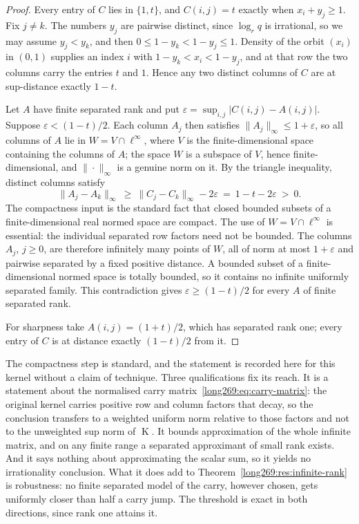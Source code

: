 \documentclass[11pt]{article}
\newcommand{\Kernel}{\operatorname{K}}
\begin{document}
\begin{proof}
Every entry of $C$ lies in $\{1,t\}$, and $C(i,j)=t$ exactly when
$x_i+y_j\ge1$.  Fix $j\ne k$.  The numbers $y_j$ are pairwise distinct, since
$\log_r q$ is irrational, so we may assume $y_j<y_k$, and then
$0\le1-y_k<1-y_j\le1$.  Density of the orbit $(x_i)$ in $(0,1)$ supplies an
index $i$ with $1-y_k<x_i<1-y_j$, and at that row the two columns carry the
entries $t$ and $1$.  Hence any two distinct columns of $C$ are at sup-distance
exactly $1-t$.

Let $A$ have finite separated rank and put
$\varepsilon=\sup_{i,j}|C(i,j)-A(i,j)|$.  Suppose $\varepsilon<(1-t)/2$.  Each
column $A_j$ then satisfies $\|A_j\|_\infty\le1+\varepsilon$, so all columns of
$A$ lie in $W=V\cap\ell^{\infty}$, where $V$ is the finite-dimensional space
containing the columns of $A$; the space $W$ is a subspace of $V$, hence
finite-dimensional, and $\|\cdot\|_\infty$ is a genuine norm on it.  By the
triangle inequality, distinct columns satisfy
\[
 \|A_j-A_k\|_\infty\ \ge\ \|C_j-C_k\|_\infty-2\varepsilon
 \ =\ 1-t-2\varepsilon\ >\ 0 .
\]
The compactness input is the standard fact that closed bounded subsets of
a finite-dimensional real normed space are compact. The use of
$W=V\cap\ell^\infty$ is essential: the individual separated row factors
need not be bounded.
The columns $A_j$, $j\ge0$, are therefore infinitely many points of $W$, all of
norm at most $1+\varepsilon$ and pairwise separated by a fixed positive
distance.  A bounded subset of a finite-dimensional normed space is totally
bounded, so it contains no infinite uniformly separated family.  This
contradiction gives $\varepsilon\ge(1-t)/2$ for every $A$ of finite separated
rank.

For sharpness take $A(i,j)=(1+t)/2$, which has separated rank one; every entry
of $C$ is at distance exactly $(1-t)/2$ from it.
\end{proof}

The compactness step is standard, and the statement is recorded here for this
kernel without a claim of technique.  Three qualifications fix its
reach.  It is a statement about the normalised carry
matrix~\eqref{long269:eq:carry-matrix}: the original kernel carries positive row and
column factors that decay, so the conclusion transfers to a weighted uniform
norm relative to those factors and not to the unweighted sup norm of
$\Kernel$.  It bounds approximation of the whole infinite matrix, and on any
finite range a separated approximant of small rank exists.  And it says nothing
about approximating the scalar sum, so it yields no irrationality conclusion.
What it does add to Theorem~\ref{long269:res:infinite-rank} is robustness: no finite
separated model of the carry, however chosen, gets uniformly closer than half a
carry jump.  The threshold is exact in both directions, since rank one attains
it.
\end{document}
